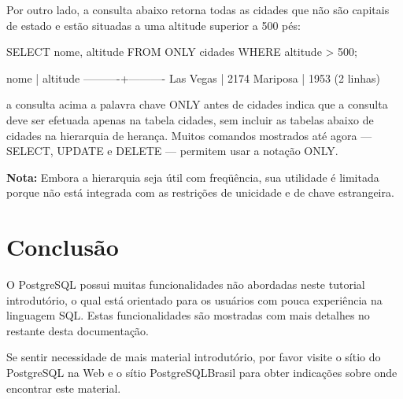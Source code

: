 Por outro lado, a consulta abaixo retorna todas as cidades que não são capitais de estado e estão situadas a uma altitude superior a 500 pés:

\begin{BoxVerbatim}
SELECT nome, altitude
    FROM ONLY cidades
    WHERE altitude > 500;

 
  nome    | altitude
----------+----------
Las Vegas |     2174
Mariposa  |     1953
(2 linhas)
\end{BoxVerbatim}

a consulta acima a palavra chave ONLY antes de cidades indica que a consulta deve ser efetuada apenas na tabela cidades, sem incluir as tabelas abaixo de cidades na hierarquia de herança. Muitos comandos mostrados até agora — SELECT, UPDATE e DELETE — permitem usar a notação ONLY.

{\bf Nota:} Embora a hierarquia seja útil com freqüência, sua utilidade é limitada porque não está integrada com as restrições de unicidade e de chave estrangeira. 


\section{Conclusão}\setcounter{SteP}{1}
O PostgreSQL possui muitas funcionalidades não abordadas neste tutorial introdutório, o qual está orientado para os usuários com pouca experiência na linguagem SQL. Estas funcionalidades são mostradas com mais detalhes no restante desta documentação.

Se sentir necessidade de mais material introdutório, por favor visite o sítio do PostgreSQL na Web e o sítio PostgreSQLBrasil para obter indicações sobre onde encontrar este material.
